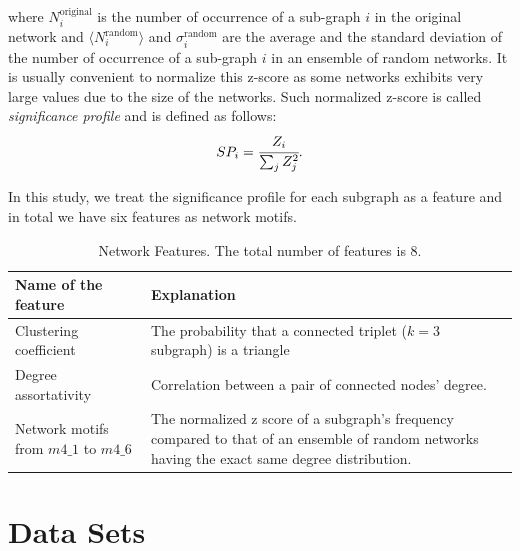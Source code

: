 \documentclass{article}
\begin{document}
where $N_i^{\text{original}}$ is the number of occurrence of a sub-graph $i$ in the original network and $ \langle N_i^{\text{random}} \rangle$ and $\sigma_i^{\text{random}}$ are the average and the standard deviation of the number of occurrence of a sub-graph $i$ in an ensemble of random networks. It is usually convenient to normalize this z-score as some networks exhibits very large values due to the size of the networks. Such normalized z-score is called \textit{significance profile} and is defined as follows:
	\begin{equation}
	SP_i = \cfrac{Z_i}{\sum_j Z_j^2}.
	\end{equation}
	
In this study, we treat the significance profile for each subgraph as a feature and in total we have six features as network motifs.
\newline



\begin{table}[htb]
  \begin{center}
    \caption{Network Features. The total number of features is $8$.}
    \begin{tabular}{| l | p{8cm} |} \hline
      Name of the feature & Explanation  \\ \hline \hline
      Clustering coefficient &  The probability that a connected triplet ($k=3$ subgraph) is a triangle \\  \hline
      Degree assortativity &  Correlation between a pair of connected nodes' degree. \\  \hline
      Network motifs from $m4\_1$ to  $m4\_6$& The normalized z score of a subgraph's frequency compared to that of an ensemble of random networks having the exact same degree distribution. \\ \hline
    \end{tabular}
    \label{tab:feature}
  \end{center}
\end{table}

\newpage
\section{Data Sets}
\end{document}
